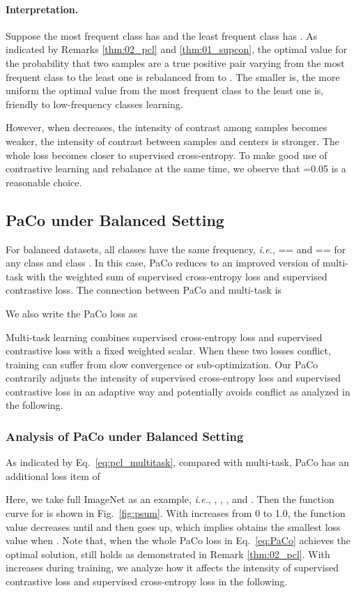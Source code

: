 \documentclass[10pt,twocolumn,letterpaper]{article}
\begin{document}
\paragraph{Interpretation.} Suppose the most frequent class  has  and the least frequent class  has . As indicated by Remarks \ref{thm:02_pcl} and \ref{thm:01_supcon}, the optimal value for the probability that two samples are a true positive pair varying from the most frequent class to the least one is rebalanced from    to   . The smaller  is, the more uniform the optimal value from the most frequent class to the least one is, friendly to low-frequency classes learning. 

However, when  decreases, the intensity of contrast among samples becomes weaker, the intensity of contrast between samples and centers is stronger. The whole loss becomes closer to supervised cross-entropy. To make good use of contrastive learning and rebalance at the same time, we observe that =0.05 is a reasonable choice.


\subsection{PaCo under Balanced Setting}
\label{sec:PaCo_balance}
For balanced datasets, all classes have the same frequency, {\it i.e.}, == and == for any class  and class . In this case, PaCo reduces to an improved version of multi-task with the weighted sum of supervised cross-entropy loss and supervised contrastive loss. The connection between PaCo and multi-task is


We also write the PaCo loss as



Multi-task learning combines supervised cross-entropy loss and supervised contrastive loss with a fixed weighted scalar. When these two losses conflict,  training can suffer from slow convergence or sub-optimization. Our PaCo contrarily adjusts the intensity of supervised cross-entropy loss and supervised contrastive loss in an adaptive way and potentially avoids conflict as analyzed in the following.

\subsubsection{Analysis of PaCo under Balanced Setting}
As indicated by Eq.~\eqref{eq:pcl_multitask}, compared with multi-task, PaCo has an additional loss item of


Here, we take full ImageNet as an example, {\it i.e.}, , , , and .
Then the function curve for  is shown in Fig.~\ref{fig:psum}.
With  increases from 0 to 1.0, the function value decreases until  and then goes up, which implies  obtains the smallest loss value when . Note that, when the whole PaCo loss in Eq.~\eqref{eq:PaCo} achieves the optimal solution,  still holds as demonstrated in Remark \ref{thm:02_pcl}. With  increases during training, we analyze how it affects the intensity of supervised contrastive loss and supervised cross-entropy loss in the following.
\end{document}
